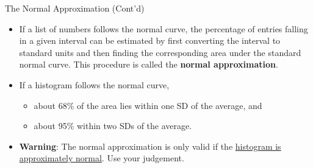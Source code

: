 \documentclass[
  ignorenonframetext,
]{beamer}
\providecommand{\tightlist}{%
  \setlength{\itemsep}{0pt}\setlength{\parskip}{0pt}}
\begin{document}
\begin{frame}{The Normal Approximation (Cont'd)}
\protect\hypertarget{the-normal-approximation-contd}{}
\begin{itemize}
\item
  If a list of numbers follows the normal curve, the percentage of
  entries falling in a given interval can be estimated by first
  converting the interval to standard units and then finding the
  corresponding area under the standard normal curve. This procedure is
  called the \textbf{normal approximation}.
\item
  If a histogram follows the normal curve,

  \begin{itemize}
  \tightlist
  \item
    about 68\% of the area lies within one SD of the average, and
  \item
    about 95\% within two SDs of the average.
  \end{itemize}
\item
  \textbf{Warning}: The normal approximation is only valid if the
  \underline{histogram is approximately normal}. Use your judgement.
\end{itemize}
\end{frame}
\end{document}
